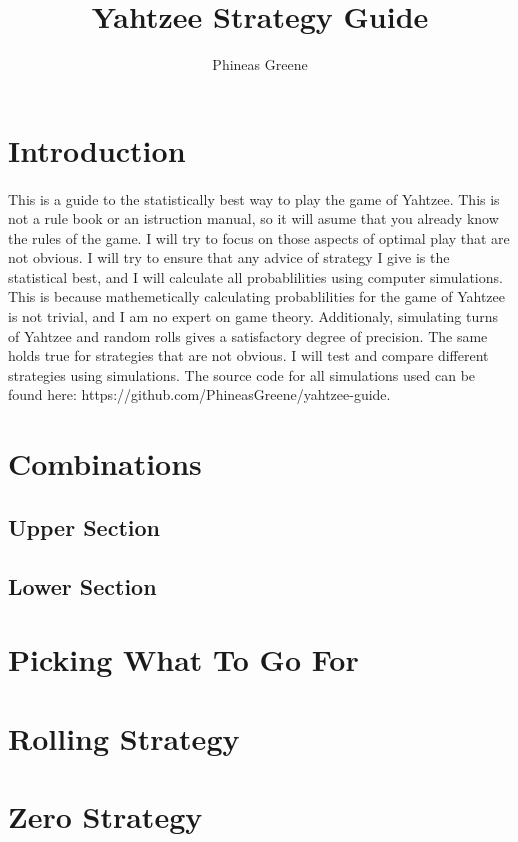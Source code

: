 \documentclass{article}
\title{Yahtzee Strategy Guide}
\author{Phineas Greene}
\begin{document}
\maketitle

\section{Introduction}
\paragraph{}
This is a guide to the statistically best way to play the game of Yahtzee. This is not a rule book or an istruction manual, so it will asume that you already know the rules of the game. I will try to focus on those aspects of optimal play that are not obvious.  I will try to ensure that any advice of strategy I give is the statistical best, and I will calculate all probablilities using computer simulations. This is because mathemetically calculating probablilities for the game of Yahtzee is not trivial, and I am no expert on game theory. Additionaly, simulating turns of Yahtzee and random rolls gives a satisfactory degree of precision. The same holds true for strategies that are not obvious. I will test and compare different strategies using simulations. The source code for all simulations used can be found here: https://github.com/PhineasGreene/yahtzee-guide.

\section{Combinations}
\subsection{Upper Section}
\subsection{Lower Section}

\section{Picking What To Go For}

\section{Rolling Strategy}

\section{Zero Strategy}
\end{document}
